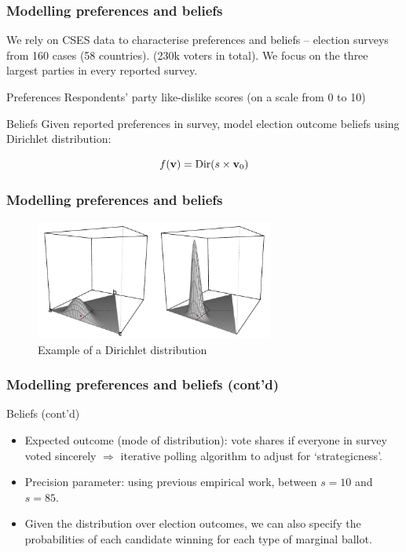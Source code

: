 \documentclass[10pt, en-GB]{beamer}
\begin{document}
\begin{frame}[t]\frametitle{Modelling preferences and beliefs}

We rely on CSES data to characterise preferences and beliefs -- election surveys from 160 cases (58 countries). (230k voters in total). We focus on the three largest parties in every reported survey.
\pause
\begin{block}{Preferences}
	Respondents' party like-dislike scores (on a scale from 0 to 10)
\end{block}
\pause
\begin{block}{Beliefs}
	Given reported preferences in survey, model election outcome beliefs using Dirichlet distribution:

	\begin{equation*}
		f({\bf v}) = \text{Dir} (s \times {\bf v}_0)
	\end{equation*}
\end{block}
\end{frame}

\begin{frame}[t]\frametitle{Modelling preferences and beliefs}

\begin{figure}[tb]
	\centering
	\includegraphics[width = 0.7\textwidth]{pres_fig/dirichlet_contour}
	\caption{Example of a Dirichlet distribution}
	\label{dirichlet}
\end{figure}
\end{frame}

\begin{frame}[t]\frametitle{Modelling preferences and beliefs (cont'd)}

\begin{block}{Beliefs (cont'd)}
\begin{itemize}
\item Expected outcome (mode of distribution): vote shares if everyone in survey voted sincerely $\Rightarrow$ iterative polling algorithm to adjust for `strategicness'.
\item Precision parameter: using previous empirical work, between $s = 10$ and $s = 85$. 
\item Given the distribution over election outcomes, we can also specify the probabilities of each candidate winning for each type of marginal ballot.
\end{itemize} 
\end{block}    
\end{frame}
\end{document}

